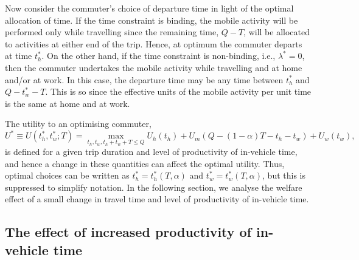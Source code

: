 \documentclass[12pt,a4paper,british]{article}
\begin{document}
Now consider the commuter's choice of departure time in light of the optimal allocation of time. If the time constraint is binding, the mobile activity will be performed only while travelling since the remaining time, $Q-T$, will be allocated to activities at either end of the trip. Hence, at optimum the commuter departs at time $t_{h}^{\ast}$. On the other hand, if the time constraint is non-binding, i.e., $\lambda^{\ast}=0$, then the commuter undertakes the mobile activity while travelling and at home and/or at work. In this case, the departure time may be any time between $t_{h}^{\ast}$ and $Q-t_{w}^{\ast}-T$. This is so since the effective units of the mobile activity per unit time is the same at home and at work.
\begin{comment}
Since travel time is deterministic, there is no need for the commuter to give head start. As such the departure time can set in such a way that it is aligned with the optimal time allocation. The optimal departure time depends on whether or not the time constraint is binding. If the time constraint is binding, time at the origin and destination will be fully devoted to the home-based activity and the work-based activity, respectively, with the mobile activity being carried out only while travelling.
\end{comment}

The utility to an optimising commuter,%
\begin{equation}
U^{\ast}\equiv U\left(t_{h}^{\ast},t_{w}^{\ast};T\right)=\max_{t_{h},t_{w},t_{h}+t_{w}+T\leq Q}U_{h}\left(t_{h}\right)+U_{m}\left(Q-\left(1-\alpha\right)T-t_{h}-t_{w}\right)+U_{w}\left(t_{w}\right),
\label{eq:UStarDet}
\end{equation}
is defined for a given trip duration and level of productivity of in-vehicle time, and hence a change in these quantities can affect the optimal utility. Thus, optimal choices can be written as $t_h^{\ast}= t_h^{\ast} \left(T, \alpha \right)$ and $t_w^{\ast} = t_w^{\ast} \left(T, \alpha \right)$, but this is suppressed to simplify notation. In the following section, we analyse the welfare effect of a small change in travel time and level of productivity of in-vehicle time. 


\subsection*{The effect of increased productivity of in-vehicle time}
\end{document}
